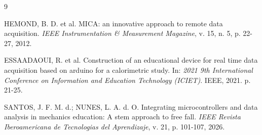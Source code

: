 \documentclass[12pt,a4paper]{article}
\begin{document}
\newpage
\renewcommand\refname{Referências}
\begin{thebibliography}{9}

HEMOND, B. D. et al. MICA: an innovative approach to remote data acquisition. \textit{IEEE Instrumentation \& Measurement Magazine}, v. 15, n. 5, p. 22-27, 2012.

ESSAADAOUI, R. et al. Construction of an educational device for real time data acquisition based on arduino for a calorimetric study. In: \textit{2021 9th International Conference on Information and Education Technology (ICIET)}. IEEE, 2021. p. 21-25.

SANTOS, J. F. M. d.; NUNES, L. A. d. O. Integrating microcontrollers and data analysis in mechanics education: A stem approach to free fall. \textit{IEEE Revista Iberoamericana de Tecnologias del Aprendizaje}, v. 21, p. 101-107, 2026.

\end{thebibliography}
\end{document}
